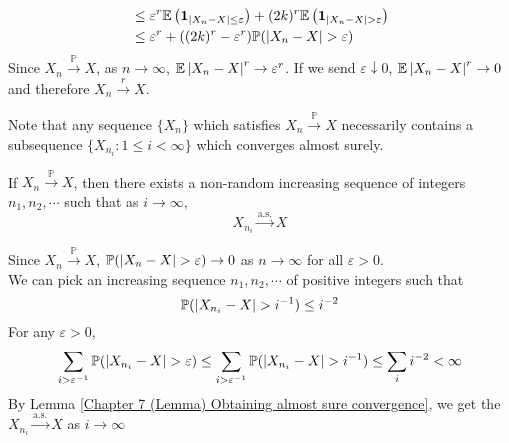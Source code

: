 \documentclass{huhtakm-template-book}
\newcommand{\prob}{\mathbb{P}}
\newcommand{\expect}{\mathbb{E}}
\begin{document}
\begin{proofing}
\begin{enumerate}
\begin{align*}
			&\leq\varepsilon^{r}\expect\left(\mathbf{1}_{\abs{X_{n}-X}\leq\varepsilon}\right)+(2k)^{r}\expect\left(\mathbf{1}_{\abs{X_{n}-X}>\varepsilon}\right)\\
			&\leq\varepsilon^{r}+((2k)^{r}-\varepsilon^{r})\prob(\abs{X_{n}-X}>\varepsilon)
		\end{align*}
		Since $X_{n}\xrightarrow{\prob}X$, as $n\to\infty$, $\expect\abs{X_{n}-X}^{r}\to\varepsilon^{r}$. If we send $\varepsilon\downarrow 0$, $\expect\abs{X_{n}-X}^{r}\to 0$ and therefore $X_{n}\xrightarrow{r}X$.
	\end{enumerate}
\end{proofing}
Note that any sequence $\{X_{n}\}$ which satisfies $X_{n}\xrightarrow{\prob}X$ necessarily contains a subsequence $\{X_{n_{i}}:1\leq i<\infty\}$ which converges almost surely.
\begin{thm}
	If $X_{n}\xrightarrow{\prob}X$, then there exists a non-random increasing sequence of integers $n_{1},n_{2},\cdots$ such that as $i\to\infty$,
	\begin{equation*}
		X_{n_{i}}\xrightarrow{\text{a.s.}}X
	\end{equation*}
\end{thm}
\begin{proofing}
	Since $X_{n}\xrightarrow{\prob}X$, $\prob(\abs{X_{n}-X}>\varepsilon)\to 0$ as $n\to\infty$ for all $\varepsilon>0$.\\
	We can pick an increasing sequence $n_{1},n_{2},\cdots$ of positive integers such that
	\begin{equation*}
		\prob(\abs{X_{n_{i}}-X}>i^{-1})\leq i^{-2}
	\end{equation*}
	For any $\varepsilon>0$,
	\begin{equation*}
		\sum_{i>\varepsilon^{-1}}\prob(\abs{X_{n_{i}}-X}>\varepsilon)\leq\sum_{i>\varepsilon^{-1}}\prob(\abs{X_{n_{i}}-X}>i^{-1})\leq\sum_{i}i^{-2}<\infty
	\end{equation*}
	By Lemma \ref{Chapter 7 (Lemma) Obtaining almost sure convergence}, we get the $X_{n_{i}}\xrightarrow{\text{a.s.}}X$ as $i\to\infty$
\end{proofing}

\newpage
\end{document}
